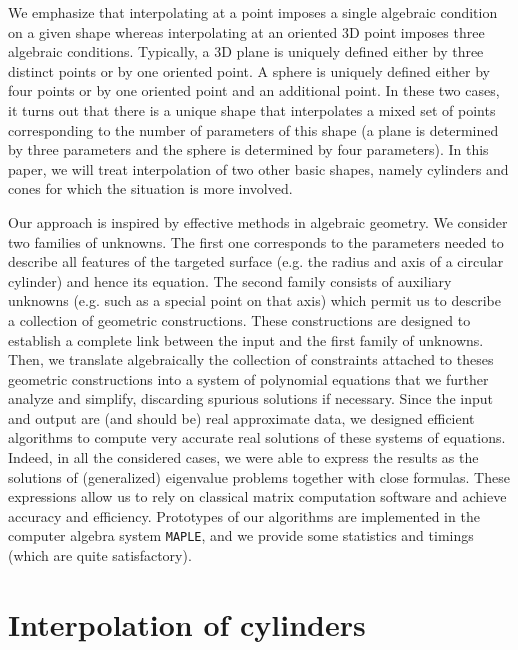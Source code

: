 \documentclass[5p]{elsarticle}
\newcommand{\com}[1]{{\color{black} #1}}
\newcommand{\lb}[1]{{\color{black} #1}}
\begin{document}
\medskip 

We emphasize that interpolating at a point imposes a single algebraic condition on a given shape whe\-re\-as interpolating at an oriented 3D point imposes three algebraic conditions. Typically, a 3D plane is uniquely defined either by three distinct points or by one oriented point. A sphere is uniquely defined either by four points or by one oriented point and an additional point. In these two cases, it turns out that there is a unique shape that interpolates a mixed set of points corresponding to the number of parameters of this shape (a plane is determined by three parameters and the sphere is determined by four parameters). In this paper, we will treat interpolation of two other basic shapes, namely cylinders and cones for which the situation is more involved.  


\medskip

Our approach is inspired by effective methods in algebraic geometry.
\lb{We consider two families of unknowns. The first one corresponds to the parameters needed to describe all features of the targeted
surface (e.g. the radius and axis of a circular cylinder) and hence its equation. The second family consists of auxiliary
unknowns (e.g. such as a special point on that axis)  which permit us to describe a collection of
geometric constructions.} These constructions are designed to establish a complete link between the input and
the first family of unknowns.
Then, we translate algebraically the collection of con\-str\-aints attached to theses geometric constructions into a system of polynomial equations
that we further analyze and simplify, discarding spurious solutions if \com{necessary}.
Since the input and output are (and should be) real approximate data, we designed efficient algorithms to compute
very accurate real solutions of these systems of equations.
Indeed, in all the considered cases, we were able to express the results as the solutions of (generalized) \com{eigenvalue problems}
together with close formulas. \com{These expressions allow us} to rely on classical matrix \com{computation} software and achieve accuracy and efficiency.
Prototypes of our algorithms \com{are} implemented in the computer algebra system {\tt MAPLE}, and we provide some statistics and
timings (which are quite satisfactory).



\section{Interpolation of cylinders} 
\end{document}
